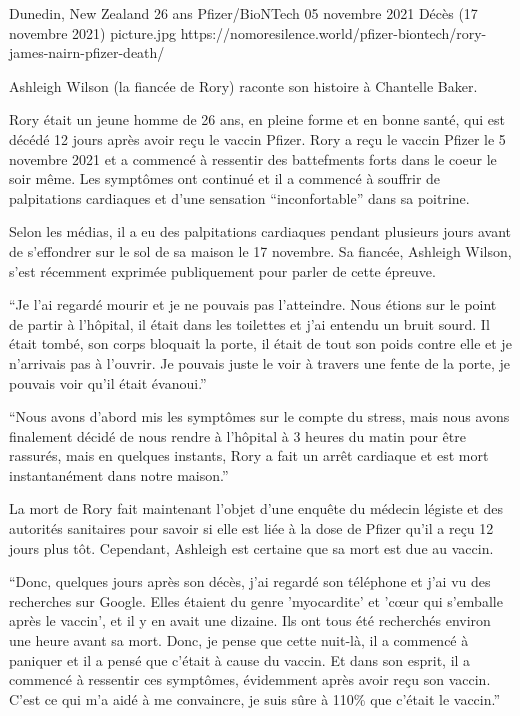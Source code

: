 {Dunedin, New Zealand}
{26 ans}
{Pfizer/BioNTech}
{05 novembre 2021}
{Décès (17 novembre 2021)}
{picture.jpg}
{https://nomoresilence.world/pfizer-biontech/rory-james-nairn-pfizer-death/}
{

Ashleigh Wilson (la fiancée de Rory) raconte son histoire à Chantelle Baker.

Rory était un jeune homme de 26 ans, en pleine forme et en bonne santé, qui est
décédé 12 jours après avoir reçu le vaccin Pfizer. Rory a reçu le vaccin Pfizer
le 5 novembre 2021 et a commencé à ressentir des battefments forts dans le coeur
le soir même. Les symptômes ont continué et il a commencé à souffrir de
palpitations cardiaques et d'une sensation “inconfortable” dans sa poitrine.

Selon les médias, il a eu des palpitations cardiaques pendant plusieurs jours
avant de s'effondrer sur le sol de sa maison le 17 novembre. Sa fiancée,
Ashleigh Wilson, s'est récemment exprimée publiquement pour parler de cette
épreuve.

“Je l'ai regardé mourir et je ne pouvais pas l'atteindre. Nous étions sur le
point de partir à l'hôpital, il était dans les toilettes et j'ai entendu un
bruit sourd. Il était tombé, son corps bloquait la porte, il était de tout son
poids contre elle et je n'arrivais pas à l'ouvrir. Je pouvais juste le voir à
travers une fente de la porte, je pouvais voir qu'il était évanoui.”

“Nous avons d'abord mis les symptômes sur le compte du stress, mais nous avons
finalement décidé de nous rendre à l'hôpital à 3 heures du matin pour être
rassurés, mais en quelques instants, Rory a fait un arrêt cardiaque et est mort
instantanément dans notre maison.”

La mort de Rory fait maintenant l'objet d'une enquête du médecin légiste et des
autorités sanitaires pour savoir si elle est liée à la dose de Pfizer qu'il a
reçu 12 jours plus tôt. Cependant, Ashleigh est certaine que sa mort est due au
vaccin.

“Donc, quelques jours après son décès, j'ai regardé son téléphone et j'ai vu des
recherches sur Google. Elles étaient du genre 'myocardite' et 'cœur qui
s'emballe après le vaccin', et il y en avait une dizaine. Ils ont tous été
recherchés environ une heure avant sa mort. Donc, je pense que cette nuit-là, il
a commencé à paniquer et il a pensé que c'était à cause du vaccin. Et dans son
esprit, il a commencé à ressentir ces symptômes, évidemment après avoir reçu son
vaccin. C'est ce qui m'a aidé à me convaincre, je suis sûre à 110\% que c'était
le vaccin.”

}

